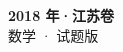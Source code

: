 \documentclass[zihao=-4, a4paper]{ctexart}
\begin{document}
\begin{center}
  {\Large\bfseries 2018 年·江苏卷}\\[4pt]
  {\large 数学 · 试题版}
\end{center}
\medskip
{}

\end{document}
